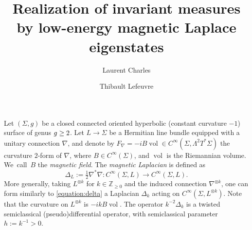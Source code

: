 \documentclass[10pt,a4paper]{amsart}
\theoremstyle{plain}
\theoremstyle{definition}
\newcommand{\Z}{\mathbb{Z}}
\DeclareMathOperator{\vol}{vol}
\begin{document}
\title[Low-energy magnetic eigenstates]{Realization of invariant measures by low-energy magnetic Laplace eigenstates}
\author{Laurent Charles\and Thibault Lefeuvre}
\date{}\maketitle\setcounter{section}{1}
Let $(\Sigma,g)$ be a closed connected oriented hyperbolic (constant curvature $-1$) surface of genus $\textsl{g} \geq 2$. Let $L \to \Sigma$ be a Hermitian line bundle equipped with a unitary connection $\nabla$, and denote by $F_\nabla = -i B \vol \in C^\infty(\Sigma, \Lambda^2 T^*\Sigma)$ the curvature $2$-form of $\nabla$, where $B \in C^\infty(\Sigma)$, and $\vol$ is the Riemannian volume. We~call~$B$ the \emph{magnetic field}. The \emph{magnetic Laplacian} is defined as
\begin{equation}
\label{equation:delta}
\Delta_L := \tfrac{1}{2} \nabla^* \nabla : C^\infty(\Sigma,L) \to C^\infty(\Sigma,L).
\end{equation}
More generally, taking $L^{\otimes k}$ for $k \in \Z_{\geq 0}$ and the induced connection $\nabla^{\otimes k}$, one can form similarly to \eqref{equation:delta} a Laplacian $\Delta_k$ acting on $C^\infty(\Sigma,L^{\otimes k})$. {\color{black}Note that the curvature on $L^{\otimes k}$ is $-ikB\vol$.} The operator $k^{-2}\Delta_k$ is a twisted semiclassical (pseudo)differential operator, with semiclassical parameter $h := k^{-1} > 0$.
\end{document}
